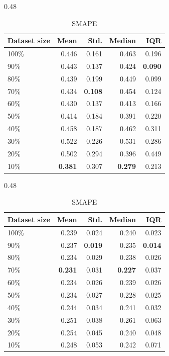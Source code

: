 \begin{table}[H]
\vspace{1em}

\begin{subtable}{0.48\textwidth}
\centering
\small
\caption{MAPE}
\label{tab:mape-glm-data-size-random-cv}
\begin{tabular}{lrrrr}
\toprule
\textbf{Dataset size} & \textbf{Mean} & \textbf{Std.} & \textbf{Median} & \textbf{IQR} \\
\midrule
100\% & 0.446 & 0.161 & 0.463 & 0.196 \\
90\%  & 0.443 & 0.137 & 0.424 & \textbf{0.090} \\
80\%  & 0.439 & 0.199 & 0.449 & 0.099 \\
70\%  & 0.434 & \textbf{0.108} & 0.454 & 0.124 \\
60\%  & 0.430 & 0.137 & 0.413 & 0.166 \\
50\%  & 0.414 & 0.184 & 0.391 & 0.220 \\
40\%  & 0.458 & 0.187 & 0.462 & 0.311 \\
30\%  & 0.522 & 0.226 & 0.531 & 0.286 \\
20\%  & 0.502 & 0.294 & 0.396 & 0.449 \\
10\%  & \textbf{0.381} & 0.307 & \textbf{0.279} & 0.213 \\
\bottomrule
\end{tabular}
\end{subtable}
\hfill
\begin{subtable}{0.48\textwidth}
\centering
\small
\caption{SMAPE}
\label{tab:smape-glm-data-size-random-cv}
\begin{tabular}{lrrrr}
\toprule
\textbf{Dataset size} & \textbf{Mean} & \textbf{Std.} & \textbf{Median} & \textbf{IQR} \\
\midrule
100\% & 0.239 & 0.024 & 0.240 & 0.023 \\
90\%  & 0.237 & \textbf{0.019} & 0.235 & \textbf{0.014} \\
80\%  & 0.234 & 0.029 & 0.238 & 0.026 \\
70\%  & \textbf{0.231} & 0.031 & \textbf{0.227} & 0.037 \\
60\%  & 0.234 & 0.026 & 0.239 & 0.026 \\
50\%  & 0.234 & 0.027 & 0.228 & 0.025 \\
40\%  & 0.244 & 0.034 & 0.241 & 0.032 \\
30\%  & 0.251 & 0.038 & 0.261 & 0.063 \\
20\%  & 0.254 & 0.045 & 0.240 & 0.048 \\
10\%  & 0.248 & 0.053 & 0.242 & 0.071 \\
\bottomrule
\end{tabular}
\end{subtable}

\end{table}

